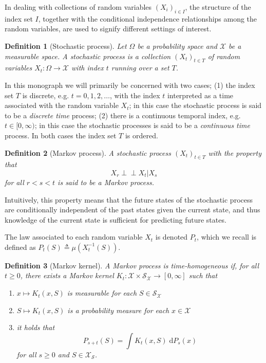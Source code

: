 \documentclass[12pt,paper=letter]{scrreprt}
\newtheorem{definition}{Definition}[chapter]
\def\defeq{\triangleq} %
\newcommand\ci{\perp\!\!\!\perp}
\begin{document}
In dealing with collections of random variables $(X_i)_{i \in I}$, the structure of the index set $I$, together with the conditional independence relationships among the random variables, are used to signify different settings of interest.

\begin{definition}[Stochastic process]
Let $\Omega$ be a probability space and $\mathcal{X}$ be a measurable space.
A \emph{stochastic process} is a collection $(X_t)_{t \in T}$ of random variables $X_t : \Omega \rightarrow \mathcal{X}$ with index $t$ running over a set $T$.
\end{definition}

\noindent In this monograph we will primarily be concerned with two cases; (1) the index set $T$ is discrete, e.g. $t =  0, 1,2,\dots$, with the index $t$ interpreted as a time associated with the random variable $X_t$; in this case the stochastic process is said to be a \emph{discrete time} process; (2) there is a continuous temporal index, e.g. $t \in [0,\infty)$; in this case the stochastic processes is said to be a \emph{continuous time} process.
In both cases the index set $T$ is ordered.

\begin{definition}[Markov process]
A stochastic process $(X_t)_{t \in T}$ with the property that
$$
X_r \ci X_t | X_s
$$
for all $r < s < t$ is said to be a \emph{Markov process}.
\end{definition}

\noindent Intuitively, this property means that the future states of the stochastic process are conditionally independent of the past states given the current state, and thus knowledge of the current state is sufficient for predicting future states.

The law associated to each random variable $X_t$ is denoted $P_t$, which we recall is defined as $P_t(S) \defeq \mu(X_t^{-1}(S))$.

\begin{definition}[Markov kernel]
\label{def: Markov kernel}
A Markov process is \emph{time-homogeneous} if, for all $t \geq 0$, there exists a \emph{Markov kernel} $K_t : \mathcal{X} \times \mathcal{S}_{\mathcal{X}} \rightarrow [0,\infty]$ such that
\begin{enumerate}
\item $x \mapsto K_t(x,S)$ is measurable for each $S \in \mathcal{S}_{\mathcal{X}}$
\item $S \mapsto K_t(x,S)$ is a probability measure for each $x \in \mathcal{X}$
\item it holds that
$$
P_{s+t}(S) = \int K_t(x,S) \; \mathrm{d}P_s(x)
$$
for all $s \geq 0$ and $S \in \mathcal{X}_{\mathcal{S}}$.
\end{enumerate}
\end{definition}
\end{document}
